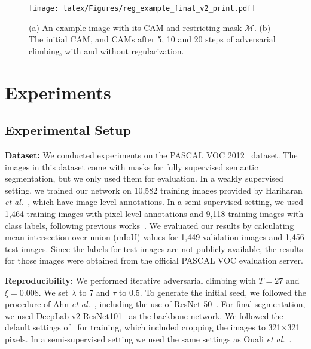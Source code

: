 \documentclass[final]{cvpr}
\begin{document}
\begin{figure}[t]
\centering
\texttt{[image: latex/Figures/reg\_example\_final\_v2\_print.pdf]}
\vspace{-1.6em}
\caption{\label{mask_ex} (a) An example image with its CAM and restricting mask $\mathcal{M}$. (b) The initial CAM, and CAMs after 5, 10 and 20 steps of adversarial climbing, with and without regularization.}
\vspace{-1.em}
\end{figure}
 

\vspace{-0.3em}
\section{Experiments}
\vspace{-0.2em}
\subsection{Experimental Setup}\label{setup_sec}
\vspace{-0.2em}
\textbf{Dataset:} We conducted experiments on the PASCAL VOC 2012~\cite{everingham2010pascal} dataset.
The images in this dataset come with masks for fully supervised semantic segmentation, but we only used them for evaluation. 
In a weakly supervised setting, we trained our network on 10,582 training images provided by Hariharan \textit{et al.}~\cite{hariharan2011semantic}, which have image-level annotations. 
In a semi-supervised setting, we used 1,464 training images with pixel-level annotations and 9,118 training images with class labels, following previous works~\cite{lee2019ficklenet, ouali2020semi, wei2018revisiting, luosemi}.
We evaluated our results by calculating mean intersection-over-union (mIoU) values for 1,449 validation images and 1,456 test images. Since the labels for test images are not publicly available, the results for those images were obtained from the official PASCAL VOC evaluation server. 

\textbf{Reproducibility:}
We performed iterative adversarial climbing with $T=27$ and $\xi=0.008$. We set $\lambda$ to 7 and $\tau$ to 0.5.
To generate the initial seed, we followed the procedure of Ahn \textit{et al.}~\cite{ahn2019weakly}, including the use of ResNet-50~\cite{he2016deep}.
For final segmentation, we used DeepLab-v2-ResNet101~\cite{chen2017deeplab} as the backbone network. We followed the default settings of~\cite{chen2017deeplab} for training, which included cropping the images to 321$\times$321 pixels.
In a semi-supervised setting we used the same settings as Ouali \textit{et al.}~\cite{ouali2020semi}.
\end{document}
